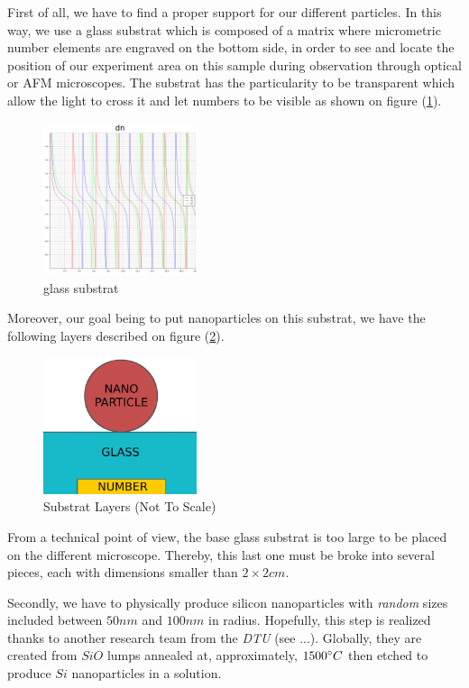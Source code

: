 \documentclass{article}
\numberwithin{equation}{section}
\begin{document}
First of all, we have to find a proper support for our different particles. In this way, we use a glass substrat which is composed of a matrix where micrometric number elements are engraved on the bottom side, in order to see and locate the position of our experiment area on this sample during observation through optical or AFM microscopes. The substrat has the particularity to be transparent which allow the light to cross it and let numbers to be visible as shown on figure (\ref{fig:substrat}).
\begin{figure}[h]
    \centering
    \includegraphics[width=0.4\textwidth, height=0.35\textwidth]{dn.png}
    \caption{glass substrat}
    \label{fig:substrat}
\end{figure}
Moreover, our goal being to put nanoparticles on this substrat, we have the following layers described on figure (\ref{fig:substrat_layers}).
\begin{figure}[h]
    \centering
    \includegraphics[width=0.4\textwidth, height=0.35\textwidth]{substrat_layers.png}
    \caption{Substrat Layers (Not To Scale)}
    \label{fig:substrat_layers}
\end{figure}
From a technical point of view, the base glass substrat is too large to be placed on the different microscope. Thereby, this last one must be broke into several pieces, each with dimensions smaller than $2 \times 2 cm$.

Secondly, we have to physically produce silicon nanoparticles with \textit{random} sizes included between $50 nm$ and $100 nm$ in radius. Hopefully, this step is realized thanks to another research team from the \textit{DTU} (see ...). Globally, they are created from $SiO$ lumps annealed at, approximately, $1500 \degree C$ then etched to produce $Si$ nanoparticles in a solution.
\end{document}

